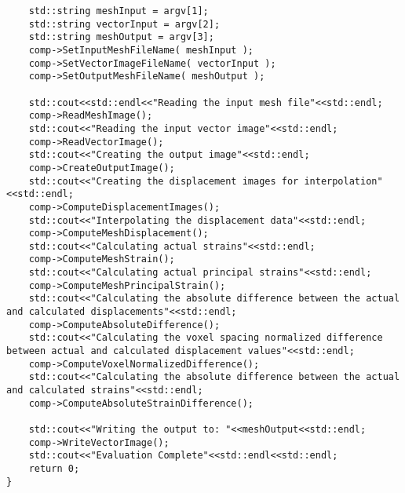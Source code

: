 \begin{lstlisting}
	std::string meshInput = argv[1];
	std::string vectorInput = argv[2];
	std::string meshOutput = argv[3];
	comp->SetInputMeshFileName( meshInput );
	comp->SetVectorImageFileName( vectorInput );
	comp->SetOutputMeshFileName( meshOutput );
	
	std::cout<<std::endl<<"Reading the input mesh file"<<std::endl;
	comp->ReadMeshImage();
	std::cout<<"Reading the input vector image"<<std::endl;
	comp->ReadVectorImage();
	std::cout<<"Creating the output image"<<std::endl;
	comp->CreateOutputImage();
	std::cout<<"Creating the displacement images for interpolation"<<std::endl;
	comp->ComputeDisplacementImages();
	std::cout<<"Interpolating the displacement data"<<std::endl;
	comp->ComputeMeshDisplacement();
	std::cout<<"Calculating actual strains"<<std::endl;
	comp->ComputeMeshStrain();
	std::cout<<"Calculating actual principal strains"<<std::endl;
	comp->ComputeMeshPrincipalStrain();
	std::cout<<"Calculating the absolute difference between the actual and calculated displacements"<<std::endl;
	comp->ComputeAbsoluteDifference();
	std::cout<<"Calculating the voxel spacing normalized difference between actual and calculated displacement values"<<std::endl;
	comp->ComputeVoxelNormalizedDifference();
	std::cout<<"Calculating the absolute difference between the actual and calculated strains"<<std::endl;
	comp->ComputeAbsoluteStrainDifference();
	
	std::cout<<"Writing the output to: "<<meshOutput<<std::endl;
	comp->WriteVectorImage();
	std::cout<<"Evaluation Complete"<<std::endl<<std::endl;
	return 0;
}

\end{lstlisting}